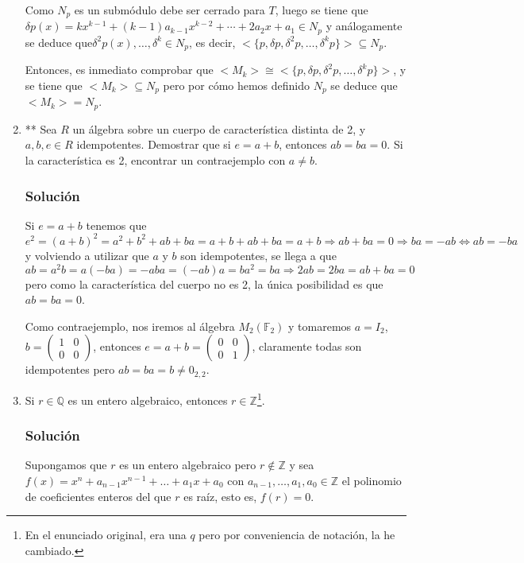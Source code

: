 \documentclass[paper=a4, fontsize=11pt, spanish]{scrartcl}
\begin{document}
\begin{enumerate}
		Como $N_p$ es un submódulo debe ser cerrado para $T$, luego se tiene
		que $\delta p(x) = kx^{k-1} + (k-1)a_{k-1}x^{k-2} + \cdots + 2a_2x+a_1 \in N_p$ y análogamente se deduce
		que$\delta^2 p(x), \dots, \delta^{k} \in N_p$, es decir, $<\{p, \delta p, \delta^2 p, \dots, \delta^k p\}>
		\subseteq N_p$.
		
		Entonces, es inmediato comprobar que $ <M_k> \cong <\{p, \delta p, \delta^2 p, \dots, \delta^k p\}>$, y
		se tiene que $<M_k> \subseteq N_p$ pero por cómo hemos definido $N_p$ se deduce que $<M_k> = N_p$.
		
		\item ** Sea $R$ un álgebra sobre un cuerpo de característica distinta de 2, y $a, b, e \in R$ idempotentes.
		Demostrar que si $e = a + b$, entonces $ab = ba = 0$. Si la característica es 2, encontrar un contraejemplo
		con $a \neq b$.
		\subsubsection*{Solución}
		Si $e = a+b$ tenemos que $e^2 = (a+b)^2 = a^2 + b^2 + ab + ba = a + b + ab + ba = a+b \Rightarrow ab + ba
		= 0 \Rightarrow ba = -ab \Leftrightarrow ab = -ba$ y volviendo a utilizar que $a$ y $b$ son idempotentes,
		se llega a que $ab = a^2b = a(-ba) = -aba = (-ab)a = ba^2 = ba \Rightarrow 2ab = 2ba = ab + ba = 0$ pero
		como la característica del cuerpo no es 2, la única posibilidad es que $ab = ba = 0$.
		
		Como contraejemplo, nos iremos al álgebra $M_2(\mathbb{F}_2)$ y tomaremos $a = I_2$, $\displaystyle b =
		\begin{pmatrix} 1 & 0 \\ 0 & 0 \end{pmatrix}$, entonces $\displaystyle e = a+b = \begin{pmatrix} 0 & 0
		\\ 0 & 1 \end{pmatrix}$, claramente todas son idempotentes pero $ab = ba = b \neq 0_{2,2}$.
	
		\item Si $r \in \mathbb{Q}$ es un entero algebraico, entonces $r \in \mathbb{Z}$\footnote{En el enunciado
		original, era una $q$ pero por conveniencia de notación, la he cambiado.}.
		\subsubsection*{Solución}
		Supongamos que $r$ es un entero algebraico pero $r \notin \mathbb{Z}$ y sea $f(x) = x^n + a_{n-1}x^{n-1}
		+ \dots + a_1x + a_0$ con $a_{n-1}, \dots, a_1, a_0 \in \mathbb{Z}$ el polinomio de coeficientes enteros
		del que $r$ es raíz, esto es, $f(r) = 0$.
		

\end{enumerate}
\end{document}
